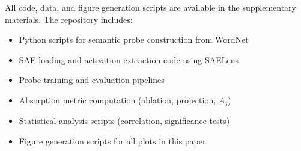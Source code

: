 \documentclass{article}
\begin{document}
All code, data, and figure generation scripts are available in the supplementary materials. The repository includes:
\begin{itemize}
    \item Python scripts for semantic probe construction from WordNet
    \item SAE loading and activation extraction code using SAELens
    \item Probe training and evaluation pipelines
    \item Absorption metric computation (ablation, projection, $A_j$)
    \item Statistical analysis scripts (correlation, significance tests)
    \item Figure generation scripts for all plots in this paper
\end{itemize}
\end{document}
